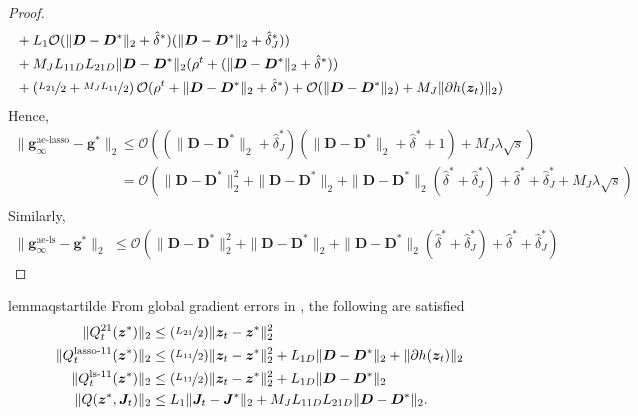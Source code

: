 \documentclass[10pt]{article} %
\newcommand{\D}{{\bm D}}
\newcommand{\J}{{\bm J}}
\newcommand{\z}{{\bm z}}
\newcommand{\g}{{\bm g}}
\begin{document}
\begin{proof}
\begin{equation}
\begin{aligned}
&+ L_1 \mathcal{O}(\|  \D - \D^{\ast} \|_2 + \hat \delta^{\ast}) (\|  \D - \D^{\ast} \|_2 + \hat \delta_J^{\ast}))\\
&+ M_J L_{11D} L_{21D} \| \D - \D^{\ast} \|_2 (\rho^{t} + (\|  \D - \D^{\ast} \|_2 + \hat \delta^{\ast}))\\
&+ \left(\nicefrac{L_{21}}{2} + \nicefrac{M_JL_{11}}{2}\right) \mathcal{O}(\rho^{t} +  \|  \D - \D^{\ast} \|_2 + \hat \delta^{\ast}) + \mathcal{O}(\| \D - \D^{\ast} \|_2) + M_J \| \partial h(\z_t) \|_2)
\end{aligned}
\end{equation}
Hence,
\begin{equation}
\begin{aligned}
\| \g_{\infty}^{\text{ae-lasso}} - \g^{\ast}  \|_2 &\leq \mathcal{O}((\|  \D - \D^{\ast} \|_2 + \hat \delta_J^{\ast}) (\|  \D - \D^{\ast} \|_2 + \hat \delta^{\ast} +1) + M_J \lambda \sqrt{s})\\
&= \mathcal{O}(\|  \D - \D^{\ast} \|_2^2 + \|  \D - \D^{\ast} \|_2 + \|  \D - \D^{\ast} \|_2 (\hat \delta^{\ast} + \hat \delta_J^{\ast}) + \hat \delta^{\ast} + \hat \delta_J^{\ast} + M_J \lambda \sqrt{s})\\
\end{aligned}
\end{equation}
Similarly,
 \begin{equation}
\begin{aligned}
\| \g_{\infty}^{\text{ae-ls}} - \g^{\ast}  \|_2 &\leq \mathcal{O}(\|  \D - \D^{\ast} \|_2^2 + \|  \D - \D^{\ast} \|_2 + \|  \D - \D^{\ast} \|_2 (\hat \delta^{\ast} + \hat \delta_J^{\ast}) + \hat \delta^{\ast} + \hat \delta_J^{\ast})
\end{aligned}
\end{equation}
%
\end{proof}
%
%
\begin{restatable}{lemma}{qstartilde}\label{lemma:qstartilde}
From global gradient errors in , the following are satisfied
\begin{equation}\label{eq:qtilde}
\begin{aligned}
\| Q_t^{21}(\z^{\ast}) \|_2 &\leq (\nicefrac{L_{21}}{2}) \| \z_t - \z^{\ast} \|_2^2\\
\| Q_t^{\text{lasso-}11}(\z^{\ast}) \|_2 &\leq (\nicefrac{L_{11}}{2}) \| \z_t - \z^{\ast} \|_2^2 + L_{1D} \| \D - \D^{\ast} \|_2 + \| \partial h(\z_t) \|_2\\
\| Q_t^{\text{ls-}11}(\z^{\ast}) \|_2 &\leq (\nicefrac{L_{11}}{2}) \| \z_t - \z^{\ast} \|_2^2 +  L_{1D} \| \D - \D^{\ast} \|_2\\
\| Q(\z^{\ast}, \J_t) \|_2 &\leq L_1 \| \J_t - \J^{\ast} \|_2 + M_J L_{11D} L_{21D} \| \D - \D^{\ast} \|_2.
\end{aligned}
\end{equation}
\end{restatable}
\end{document}
